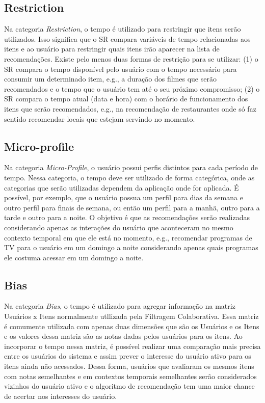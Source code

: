 \subsection{Restriction}\label{subsection:restriction}

Na categoria \textit{Restriction}, o tempo é utilizado para restringir que itens serão utilizados. Isso significa que o SR
compara variáveis de tempo relacionadas aos itens e ao usuário para restringir quais itens irão aparecer na lista de
recomendações. Existe pelo menos duas formas de restrição para se utilizar: (1) o SR compara o tempo disponível pelo
usuário com o tempo necessário para consumir um determinado item, e.g., a duração dos filmes que serão recomendados e
o tempo que o usuário tem até o seu próximo compromisso; (2) o SR compara o tempo atual (data e hora) com o horário de
funcionamento dos itens que serão recomendados, e.g., na recomendação de restaurantes onde só faz sentido recomendar
locais que estejam servindo no momento.

\subsection{Micro-profile}

Na categoria \textit{Micro-Profile}, o usuário possui perfis distintos para cada período de tempo. Nessa categoria, o tempo
deve ser utilizado de forma categórica, onde as categorias que serão utilizadas dependem da aplicação onde for aplicada.
É possível, por exemplo, que o usuário possua um perfil para dias da semana e outro perfil para finais de semana, ou
então um perfil para a manhã, outro para a tarde e outro para a noite. O objetivo é que as recomendações serão
realizadas considerando apenas as interações do usuário que aconteceram no mesmo contexto temporal em que ele está no
momento, e.g., recomendar programas de TV para o usuário em um domingo a noite considerando apenas quais programas ele
costuma acessar em um domingo a noite.

\subsection{Bias}

Na categoria \textit{Bias}, o tempo é utilizado para agregar informação na matriz Usuários x Itens normalmente utllizada pela
Filtragem Colaborativa. Essa matriz é comumente utilizada com apenas duas dimensões que são os Usuários e os Itens e os
valores dessa matriz são as notas dadas pelos usuários para os itens. Ao incorporar o tempo nessa matriz, é possível
realizar uma comparação mais precisa entre os usuários do sistema e assim prever o interesse do usuário ativo para os
itens ainda não acessados. Dessa forma, usuários que avaliaram os mesmos itens com notas semelhantes e em contextos
temporais semelhantes serão considerados vizinhos do usuário ativo e o algoritmo de recomendação tem uma maior chance
de acertar nos interesses do usuário.

